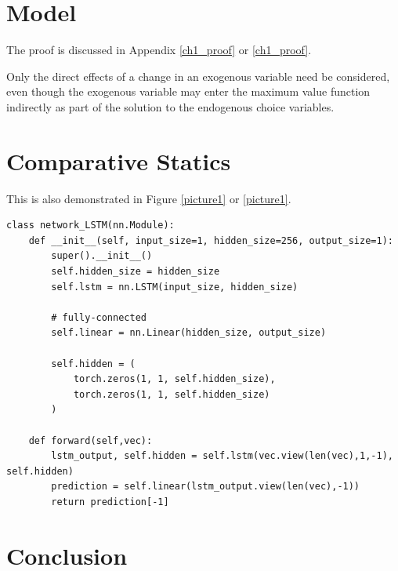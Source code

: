 \section{Model}
\lipsum[3-4] The proof is discussed in Appendix \ref{ch1_proof} or \cref{ch1_proof}.

\begin{theorem}
\onehalfspacing
  Only the direct effects of a change in an exogenous variable need be considered, even though the exogenous variable may enter the maximum value function indirectly as part of the solution to the endogenous choice variables.
\end{theorem}

\section{Comparative Statics}
This is also demonstrated in Figure \ref{picture1} or \cref{picture1}.

\begin{lstlisting}[style=python_code, caption={Long short-term memory}, label=mypythoncode]
class network_LSTM(nn.Module):
    def __init__(self, input_size=1, hidden_size=256, output_size=1):
        super().__init__()
        self.hidden_size = hidden_size
        self.lstm = nn.LSTM(input_size, hidden_size)

        # fully-connected
        self.linear = nn.Linear(hidden_size, output_size)

        self.hidden = (
            torch.zeros(1, 1, self.hidden_size),
            torch.zeros(1, 1, self.hidden_size)
        )

    def forward(self,vec):
        lstm_output, self.hidden = self.lstm(vec.view(len(vec),1,-1), self.hidden)
        prediction = self.linear(lstm_output.view(len(vec),-1))
        return prediction[-1]
\end{lstlisting}

\section{Conclusion}
\lipsum[7-9]
